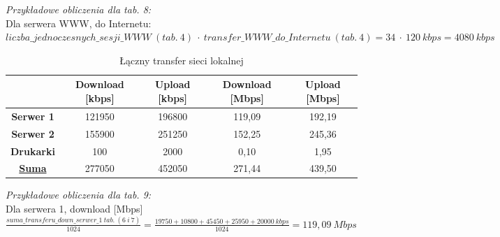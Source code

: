 \documentclass[a4paper, 12pt]{article}
\begin{document}
\begin{itemize}
\noindent \textit{Przykładowe obliczenia dla tab. 8:}\\
Dla serwera WWW, do Internetu:\\
\(liczba\_jednoczesnych\_sesji\_WWW\ (tab.\ 4)\ \cdot\ transfer\_WWW\_do\_Internetu\ (tab.\ 4) = 34\ \cdot\ 120\ kbps = 4080\ kbps\)\\


\begin{table}[H]
	\centering
\begin{tabular}{|c|c|c|c|c|}
\hline
                    & \textbf{Download {[}kbps{]}} & \textbf{Upload {[}kbps{]}} & \textbf{Download {[}Mbps{]}} & \textbf{Upload {[}Mbps{]}} \\ \hline
\textbf{Serwer 1}   & 121950                       & 196800                     & 119,09                       & 192,19                     \\ \hline
\textbf{Serwer 2}   & 155900                       & 251250                     & 152,25                       & 245,36                     \\ \hline
\textbf{Drukarki}   & 100                          & 2000                       & 0,10                         & 1,95                       \\ \hline
{\ul \textbf{Suma}} & 277050                       & 452050                     & 271,44                       & 439,50                     \\ \hline
\end{tabular}
	\caption{Łączny transfer sieci lokalnej}
\end{table}
	
\noindent \textit{Przykładowe obliczenia dla tab. 9:}\\
Dla serwera 1, download [Mbps]\\
\(\frac{suma\_transferu\_down\_serwer\_1\ tab.\ (6\ i\ 7)}{1024} =\frac{19750+10800+45450+25950+20000\ kbps}{1024} = 119,09\ Mbps\)\\
	

\end{itemize}
\end{document}
